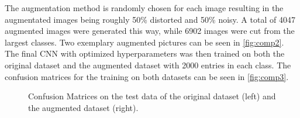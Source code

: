 \noindent
The augmentation method is randomly chosen for each image resulting in the augmentated images being roughly 50\% distorted and 50\% noisy. A total of 4047 augmented images were generated this way, while 6902 images were cut from the largest classes. 
Two exemplary augmented pictures can be seen in \autoref{fig:comp2}. The final CNN with optimized hyperparameters was then trained on both the original dataset and the augmented dataset with 2000 entries in each class. The confusion matrices for the training on both datasets can be seen in \autoref{fig:comp3}. 
\begin{figure}[H]
    \centering
    \begin{subfigure}{0.49\textwidth}
        \centering
    \end{subfigure}
    \hfill
    \begin{subfigure}{0.49\textwidth}
        \centering
    \end{subfigure}
    \caption{Confusion Matrices on the test data of the original dataset (left) and the augmented dataset (right).}
    \label{fig:comp3}
\end{figure}
